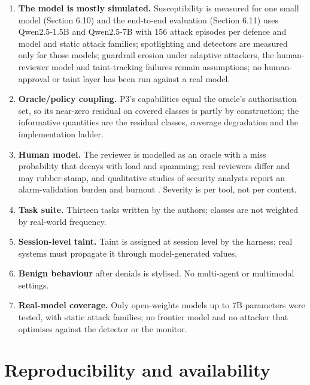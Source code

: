 \documentclass[11pt]{article}
\providecommand{\tightlist}{\setlength{\itemsep}{0pt}\setlength{\parskip}{0pt}}
\begin{document}
\begin{enumerate}
\def\labelenumi{\arabic{enumi}.}
\tightlist
\item
  \textbf{The model is mostly simulated.} Susceptibility is measured for one small model (Section 6.10) and the end-to-end evaluation (Section 6.11) uses Qwen2.5-1.5B and Qwen2.5-7B with 156 attack episodes per defence and model and static attack families; spotlighting and detectors are measured only for those models; guardrail erosion under adaptive attackers, the human-reviewer model and taint-tracking failures remain assumptions; no human-approval or taint layer has been run against a real model.
\item
  \textbf{Oracle/policy coupling.} P3's capabilities equal the oracle's authorisation set, so its near-zero residual on covered classes is partly by construction; the informative quantities are the residual classes, coverage degradation and the implementation ladder.
\item
  \textbf{Human model.} The reviewer is modelled as an oracle with a miss probability that decays with load and spamming; real reviewers differ and may rubber-stamp, and qualitative studies of security analysts report an alarm-validation burden and burnout \cite{alahmadi}. Severity is per tool, not per content.
\item
  \textbf{Task suite.} Thirteen tasks written by the authors; classes are not weighted by real-world frequency.
\item
  \textbf{Session-level taint.} Taint is assigned at session level by the harness; real systems must propagate it through model-generated values.
\item
  \textbf{Benign behaviour} after denials is stylised. No multi-agent or multimodal settings.
\item
  \textbf{Real-model coverage.} Only open-weights models up to 7B parameters were tested, with static attack families; no frontier model and no attacker that optimises against the detector or the monitor.
\end{enumerate}

\hypertarget{reproducibility-and-availability}{%
\FloatBarrier
\section{Reproducibility and availability}\label{reproducibility-and-availability}}
\end{document}
